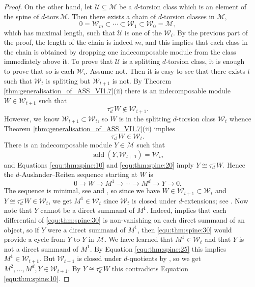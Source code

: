\documentclass[12pt,reqno]{amsart}
\def\cM{\mathscr{M}}
\def\cU{\mathscr{U}}
\def\cW{\mathscr{W}}
\def\add{\operatorname{add}}
\def\dtors{d\mbox{-tors}}
\numberwithin{equation}{section}
\theoremstyle{definition}
\theoremstyle{theorem}
\theoremstyle{definition}
\begin{document}
\begin{proof}
On the other hand, let $\cU \subseteq \cM$ be a $d$-torsion class which is an element of the spine of $\dtors\,\cM\!$.  Then there exists a chain of $d$-torsion classes in $\cM\!$,
\[
  0 = \cW_m \subset \cdots \subset \cW_1 \subset \cW_0 = \cM\!,
\]
which has maximal length, such that $\cU$ is one of the $\cW_i$.  By the previous part of the proof, the length of the chain is indeed $m$, and this implies that each class in the chain is obtained by dropping one indecomposable module from the class immediately above it.  To prove that $\cU$ is a splitting $d$-torsion class, it is enough to prove that so is each $\cW_i$.  Assume not.  Then it is easy to see that there exists $t$ such that $\cW_t$ is splitting but $\cW_{ t+1 }$ is not.  By Theorem \ref{thm:generalisation_of_ASS_VI1.7}(ii) there is an indecomposable module $W \in \cW_{ t+1 }$ such that
\begin{equation}
\label{equ:thm:spine:10}
  \tau_d^-W \not\in \cW_{ t+1 }.
\end{equation}
However, we know $\cW_{ t+1 } \subset \cW_t$, so $W$ is in the splitting $d$-torsion class $\cW_t$ whence Theorem \ref{thm:generalisation_of_ASS_VI1.7}(ii) implies 
\begin{equation}
\label{equ:thm:spine:20}
  \tau_d^-W \in \cW_t.
\end{equation}
There is an indecomposable module $Y \in \cM$ such that 
\begin{equation}
\label{equ:thm:spine:25}
  \add( Y,\cW_{ t+1 } ) = \cW_t,
\end{equation}
and Equations \eqref{equ:thm:spine:10} and \eqref{equ:thm:spine:20} imply $Y \cong \tau_d^-W$.  Hence the $d$-Auslander--Reiten sequence starting at $W$ is
\begin{equation}
\label{equ:thm:spine:30}
  0
  \xrightarrow{} W
  \xrightarrow{} M^1
  \xrightarrow{} \cdots
  \xrightarrow{} M^d
  \xrightarrow{} Y
  \xrightarrow{} 0.
\end{equation}
The sequence is minimal, see \cite[def.\ 3.1]{Iyama_Higher-dimensional-AR-theory} and \cite[rmk.\ 4.5]{Fedele_d-Auslander-Reiten-sequences_in_subcategories}, so since we have $W \in \cW_{ t+1 } \subset \cW_t$ and $Y \cong \tau_d^-W \in \cW_t$, we get $M^1 \in \cW_t$ since $\cW_t$ is closed under $d$-extensions; see \cite[lem.\ 3.8(1) and prop.\ 3.11]{August-et-al_A-characterisation-of-higher-torsion-classes}.  Now note that $Y$ cannot be a direct summand of $M^1$.  Indeed, \cite[lem.\ 3.8]{Pasquali_Tensor-products-of-n-complete-algebras} implies that each differential of \eqref{equ:thm:spine:30} is non-vanishing on each direct summand of an object, so if $Y$ were a direct summand of $M^1$, then \eqref{equ:thm:spine:30} would provide a cycle from $Y$ to $Y$ in $\cM$.  We have learned that $M^1 \in \cW_t$ and that $Y$ is not a direct summand of $M^1$.  By Equation \eqref{equ:thm:spine:25} this implies $M^1 \in \cW_{ t+1 }$.  But $\cW_{ t+1 }$ is closed under $d$-quotients by \cite[lem.\ 3.8(2) and prop.\ 3.11]{August-et-al_A-characterisation-of-higher-torsion-classes}, so we get $M^2, \ldots, M^d, Y \in \cW_{ t+1 }$.  By $Y \cong \tau_d^-W$ this contradicts Equation \eqref{equ:thm:spine:10}.
\end{proof}
\end{document}
